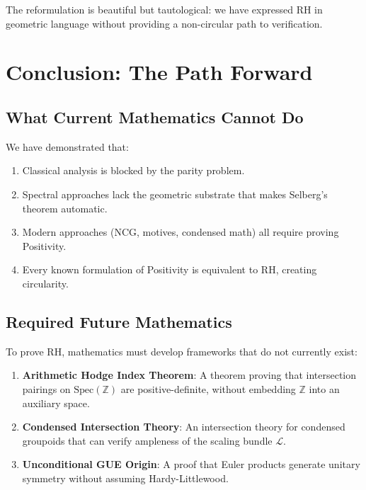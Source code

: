 \documentclass[12pt, a4paper]{article}
\theoremstyle{definition}
\newcommand{\Z}{\mathbb{Z}}
\newcommand{\Spec}{\mathrm{Spec}}
\begin{document}
The reformulation is beautiful but tautological: we have expressed RH in geometric language without providing a non-circular path to verification.

\section{Conclusion: The Path Forward}

\subsection{What Current Mathematics Cannot Do}

We have demonstrated that:
\begin{enumerate}
\item Classical analysis is blocked by the parity problem.
\item Spectral approaches lack the geometric substrate that makes Selberg's theorem automatic.
\item Modern approaches (NCG, motives, condensed math) all require proving Positivity.
\item Every known formulation of Positivity is equivalent to RH, creating circularity.
\end{enumerate}

\subsection{Required Future Mathematics}

To prove RH, mathematics must develop frameworks that do not currently exist:

\begin{enumerate}
\item \textbf{Arithmetic Hodge Index Theorem}: A theorem proving that intersection pairings on $\Spec(\Z)$ are positive-definite, without embedding $\Z$ into an auxiliary space.

\item \textbf{Condensed Intersection Theory}: An intersection theory for condensed groupoids that can verify ampleness of the scaling bundle $\mathcal{L}$.

\item \textbf{Unconditional GUE Origin}: A proof that Euler products generate unitary symmetry without assuming Hardy-Littlewood.
\end{enumerate}
\end{document}
